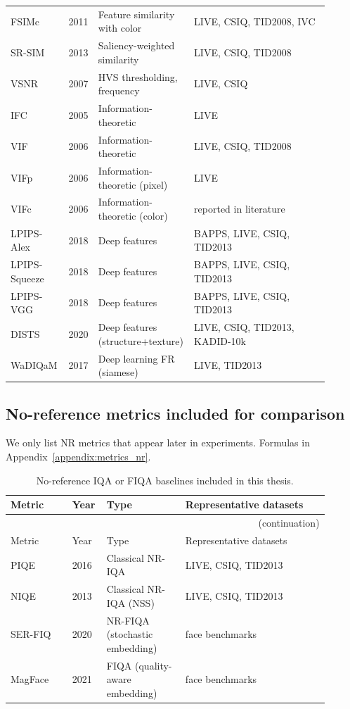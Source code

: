 \begin{longtable}{
p{0.18\linewidth}  %
p{0.07\linewidth}  %
p{0.23\linewidth}  %
p{0.42\linewidth}  %
}
FSIMc & 2011 & Feature similarity with color & LIVE, CSIQ, TID2008, IVC \\
SR-SIM & 2013 & Saliency-weighted similarity & LIVE, CSIQ, TID2008 \\
VSNR & 2007 & HVS thresholding, frequency & LIVE, CSIQ \\
IFC & 2005 & Information-theoretic & LIVE \\
VIF & 2006 & Information-theoretic & LIVE, CSIQ, TID2008 \\
VIFp & 2006 & Information-theoretic (pixel) & LIVE \\
VIFc & 2006 & Information-theoretic (color) & reported in literature \\
LPIPS-Alex & 2018 & Deep features & BAPPS, LIVE, CSIQ, TID2013 \\
LPIPS-Squeeze & 2018 & Deep features & BAPPS, LIVE, CSIQ, TID2013 \\
LPIPS-VGG & 2018 & Deep features & BAPPS, LIVE, CSIQ, TID2013 \\
DISTS & 2020 & Deep features (structure+texture) & LIVE, CSIQ, TID2013, KADID-10k \\
WaDIQaM & 2017 & Deep learning FR (siamese) & LIVE, TID2013 \\
\hline
\end{longtable}

\subsection{No-reference metrics included for comparison}\label{sec:nr_metrics_table}
We only list NR metrics that appear later in experiments. Formulas in Appendix~\ref{appendix:metrics_nr}.

\begin{longtable}{
p{0.18\linewidth}
p{0.07\linewidth}
p{0.23\linewidth}
p{0.42\linewidth}
}
\caption{No-reference IQA or FIQA baselines included in this thesis.}\label{tab:nr_iqa_metrics_compact}\\
\hline
Metric & Year & Type & Representative datasets \\
\hline
\endfirsthead
\multicolumn{4}{r}{(continuation)}\\
\hline
Metric & Year & Type & Representative datasets \\
\hline
\endhead
\hline
\endfoot

PIQE & 2016 & Classical NR-IQA & LIVE, CSIQ, TID2013 \\
NIQE & 2013 & Classical NR-IQA (NSS) & LIVE, CSIQ, TID2013 \\
SER-FIQ & 2020 & NR-FIQA (stochastic embedding) & face benchmarks \\
MagFace & 2021 & FIQA (quality-aware embedding) & face benchmarks \\
\hline
\end{longtable}

